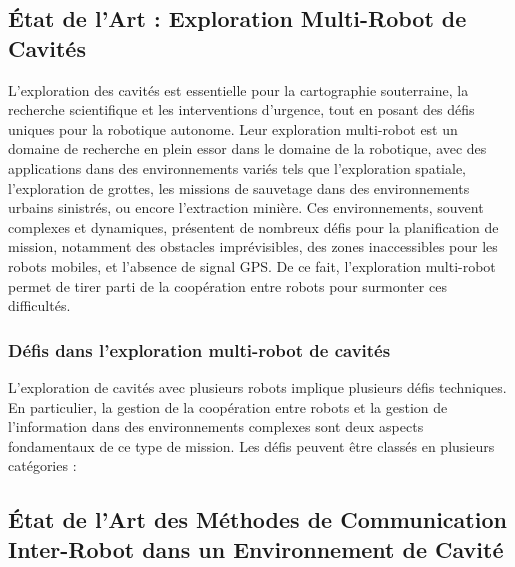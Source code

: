 \documentclass[../main.tex]{subfiles}
\begin{document}
\subsection{État de l'Art : Exploration Multi-Robot de Cavités}

L'exploration des cavités est essentielle pour la cartographie souterraine, la recherche scientifique et les interventions d'urgence, tout en posant des défis uniques pour la robotique autonome.\cite{nationalgeographic_greenland_caves_2025}
Leur exploration multi-robot est un domaine de recherche en plein essor dans le domaine de la robotique, avec des applications dans des environnements variés tels que l'exploration spatiale, l'exploration de grottes, les missions de sauvetage dans des environnements urbains sinistrés, ou encore l'extraction minière.\cite{dang_2021,kambesis_2007} Ces environnements, souvent complexes et dynamiques, présentent de nombreux défis pour la planification de mission, notamment des obstacles imprévisibles, des zones inaccessibles pour les robots mobiles, et l'absence de signal GPS. De ce fait, l'exploration multi-robot permet de tirer parti de la coopération entre robots pour surmonter ces difficultés.

\subsubsection{Défis dans l'exploration multi-robot de cavités}

L'exploration de cavités avec plusieurs robots implique plusieurs défis techniques. En particulier, la gestion de la coopération entre robots et la gestion de l'information dans des environnements complexes sont deux aspects fondamentaux de ce type de mission. Les défis peuvent être classés en plusieurs catégories : 


\subsection{État de l'Art des Méthodes de Communication Inter-Robot dans un Environnement de Cavité}
\end{document}
